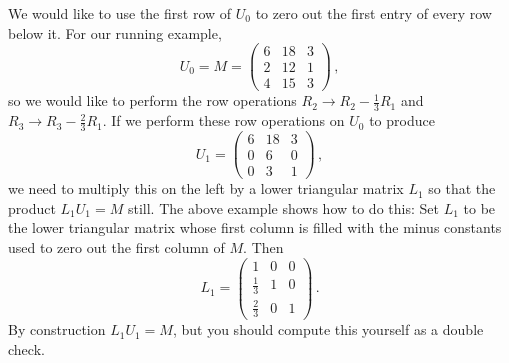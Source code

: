 \vspace{2mm}
We would like to  use the first row of $U_0$ to zero out the first entry of every row below it.  For our running example, \[U_0=M=\begin{pmatrix}
6 & 18 & 3 \\
2 & 12 & 1 \\
4 & 15 & 3 
\end{pmatrix}\, ,\] so we would like to perform the row operations $R_2\to R_2 -\frac 13 R_1$ and $R_3\to R_3-\frac 23R_1$.
If we perform these row operations on $U_0$ to produce 
\[U_1=\begin{pmatrix}
6 & 18 & 3 \\
0 & 6 & 0 \\
0 & 3 & 1 
\end{pmatrix}\, ,\]
we need to multiply this on the left by a lower triangular matrix $L_1$ so that the product $L_1U_1=M$ still.
The above example shows how to do this:
Set $L_1$ to be the lower triangular matrix whose first column is filled with the minus constants used to zero out the first column of $M$.  Then \[L_1 = \begin{pmatrix}
1 & 0 & 0 \\[1mm]
\frac{1}{3} & 1 & 0 \\[1mm]
\frac{2}{3} & 0 & 1 
\end{pmatrix}\, .\]  
By construction $L_1 U_1=M$, but you should compute this yourself as a double check.


